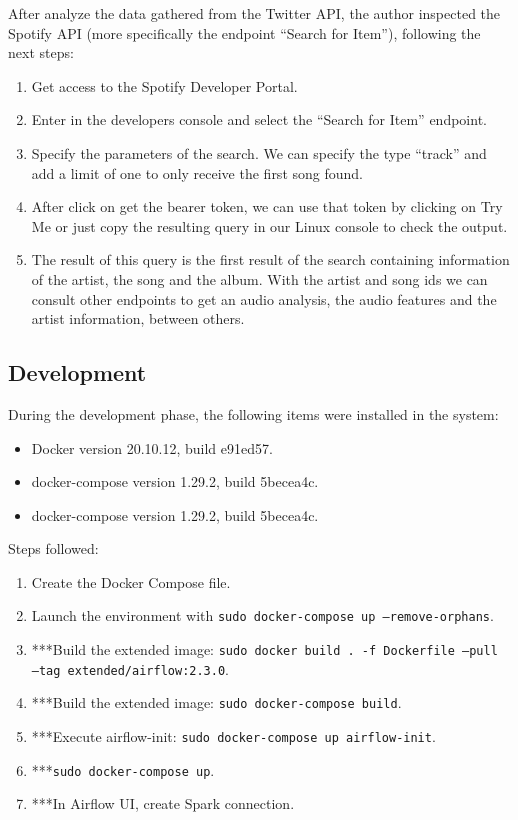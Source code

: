 \nonzeroparskip After analyze the data gathered from the Twitter API,  the author inspected the Spotify API (more specifically the endpoint ``Search for Item''), following the next steps:
\begin{enumerate}
	\item Get access to the Spotify Developer Portal.
	\item Enter in the developers console and select the ``Search for Item'' endpoint.
	\item Specify the parameters of the search. We can specify the type ``track'' and add a limit of one to only receive the first song found.
	\item After click on get the bearer token, we can use that token by clicking on Try Me or just copy the resulting query in our Linux console to check the output.
	\item The result of this query is the first result of the search containing information of the artist, the song and the album. With the artist and song ids we can consult other endpoints to get an audio analysis, the audio features and the artist information, between others.
\end{enumerate}

\subsection{Development}
\nonzeroparskip During the development phase, the following items were installed in the system:
\begin{itemize}
	\item Docker version 20.10.12, build e91ed57.
	\item docker-compose version 1.29.2, build 5becea4c.
	\item docker-compose version 1.29.2, build 5becea4c.
\end{itemize}

\nonzeroparskip Steps followed:
\begin{enumerate}
	\item Create the Docker Compose file.
	\item Launch the environment with \texttt{sudo docker-compose up --remove-orphans}.
	\item ***Build the extended image: \texttt{sudo docker build . -f Dockerfile --pull --tag extended/airflow:2.3.0}.
	\item ***Build the extended image: \texttt{sudo docker-compose build}.
	\item ***Execute airflow-init: \texttt{sudo docker-compose up airflow-init}.
	\item ***\texttt{sudo docker-compose up}.
	\item ***In Airflow UI, create Spark connection.
\end{enumerate}

